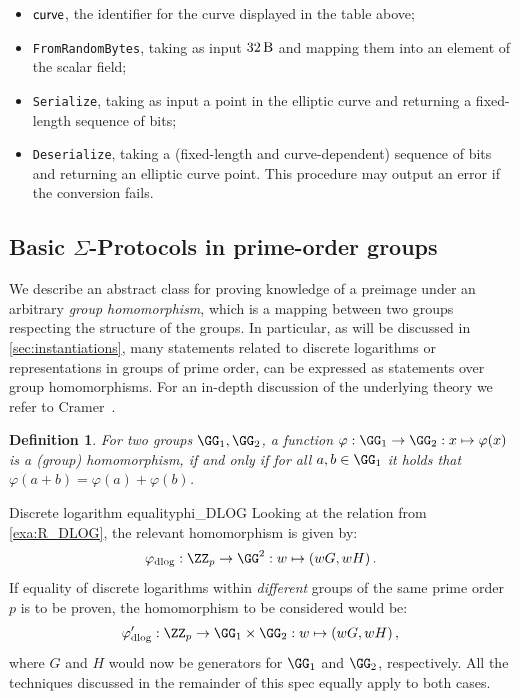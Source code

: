 \documentclass[11pt]{article}
\newtheorem{definition}{Definition}
\begin{document}
\begin{itemize}
  \item $\textsf{curve}$, the identifier for the curve displayed in the table above;
  \item \texttt{FromRandomBytes}, taking as input $\seedlen$ and mapping them into an element of the scalar field;
  \item \texttt{Serialize}, taking as input a point in the elliptic curve and returning a fixed-length sequence of bits;
  \item \texttt{Deserialize}, taking a (fixed-length and curve-dependent) sequence of bits and returning an elliptic curve point. This procedure may output an error if the conversion fails.
\end{itemize}


\subsection{Basic $\Sigma$-Protocols in prime-order groups}\label{sec:basic_sigma}
  We describe an abstract class for proving knowledge of a preimage under an arbitrary \emph{group homomorphism}, which is a mapping between two groups respecting the structure of the groups.
In particular, as will be discussed in \cref{sec:instantiations}, many statements related to discrete logarithms or representations in groups of prime order, can be expressed as statements over group homomorphisms.
For an in-depth discussion of the underlying theory we refer to Cramer~\cite{cramer97}.

\begin{definition}
  For two groups $\GG_1,\GG_2$, a function $\varphi:\GG_1\to\GG_2:x\mapsto\varphi(x)$ is a \emph{(group) homomorphism}, if and only if for all $a,b\in\GG_1$ it holds that $\varphi(a+b)=\varphi(a)+\varphi(b)$.
\end{definition}

\begin{example}{Discrete logarithm equality}{phi_DLOG}
  Looking at the relation from \cref{exa:R_DLOG}, the relevant homomorphism is given by:
	$$
	  \varphi_{\operatorname{dlog}} : \ZZ_p\to\GG^2 : \witness\mapsto (\witness G,\witness H)\,.
	$$
	If equality of discrete logarithms within \emph{different} groups of the same prime order $p$ is to be proven, the homomorphism to be considered would be:
	$$
	  \varphi_{\operatorname{dlog}}' : \ZZ_p\to\GG_1\times\GG_2 : \witness\mapsto (\witness G,\witness H)\,,
	$$
	where $G$ and $H$ would now be generators for $\GG_1$ and $\GG_2$, respectively.
	All the techniques discussed in the remainder of this spec equally apply to both cases.
\end{example}
\end{document}
